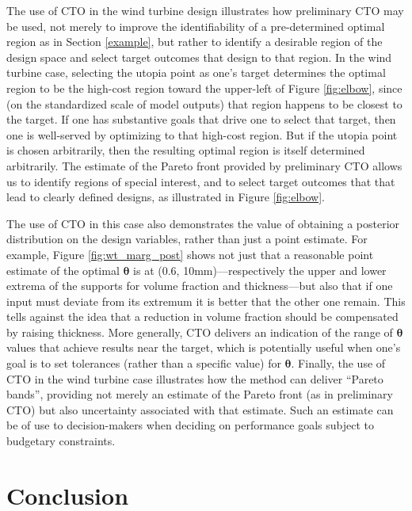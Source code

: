 \documentclass[12pt]{article}
\begin{document}
%
The use of CTO in the wind turbine design illustrates how preliminary CTO may be used, not merely to improve the identifiability of a pre-determined optimal region as in Section \ref{example}, but rather to identify a desirable region of the design space and select target outcomes that design to that region.
%
In the wind turbine case, selecting the utopia point as one's target determines the optimal region to be the high-cost region toward the upper-left of Figure \ref{fig:elbow}, since (on the standardized scale of model outputs) that region happens to be closest to the target.
%
If one has substantive goals that drive one to select that target, then one is well-served by optimizing to that high-cost region.
%
But if the utopia point is chosen arbitrarily, then the resulting optimal region is itself determined arbitrarily.
%
The estimate of the Pareto front provided by preliminary CTO allows us to identify regions of special interest, and to select target outcomes that that lead to clearly defined designs, as illustrated in Figure \ref{fig:elbow}.
%

%
The use of CTO in this case also demonstrates the value of obtaining a posterior distribution on the design variables, rather than just a point estimate.
%
For example, Figure \ref{fig:wt_marg_post} shows not just that a reasonable point estimate of the optimal $\boldsymbol\theta$ is at (0.6, 10mm)---respectively the upper and lower extrema of the supports for volume fraction and thickness---but also that if one input must deviate from its extremum it is better that the other one remain.
%
This tells against the idea that a reduction in volume fraction should be compensated by raising thickness.
%
More generally, CTO delivers an indication of the range of $\boldsymbol\theta$ values that achieve results near the target, which is potentially useful when one's goal is to set tolerances (rather than a specific value) for $\boldsymbol\theta$.
%
Finally, the use of CTO in the wind turbine case illustrates how the method can deliver ``Pareto bands'', providing not merely an estimate of the Pareto front (as in preliminary CTO) but also uncertainty associated with that estimate.
%
Such an estimate can be of use to decision-makers when deciding on performance goals subject to budgetary constraints.



\section{Conclusion} \label{conclusion}
\end{document}
